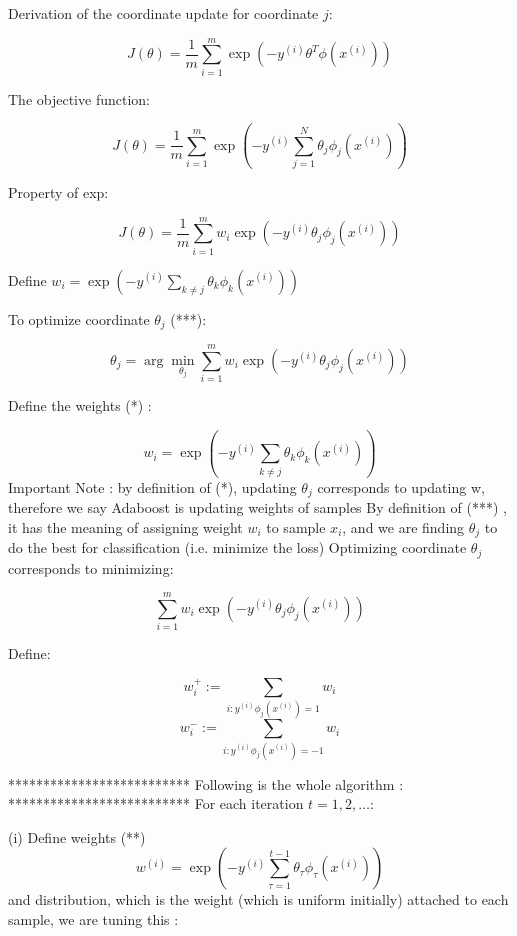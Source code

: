 \documentclass{article}
\begin{document}
Derivation of the coordinate update for coordinate \( j \):

$$J(\theta) = \frac{1}{m} \sum_{i=1}^{m} \exp(-y^{(i)} \theta^T \phi(x^{(i)}))$$

The objective function:

$$J(\theta) = \frac{1}{m} \sum_{i=1}^{m} \exp \left( -y^{(i)} \sum_{j=1}^{N} \theta_j \phi_j(x^{(i)}) \right)$$

Property of exp:

$$J(\theta) = \frac{1}{m} \sum_{i=1}^{m} w_i \exp \left( -y^{(i)} \theta_j \phi_j(x^{(i)}) \right)$$

Define \( w_i = \exp \left( -y^{(i)} \sum_{k \neq j} \theta_k \phi_k(x^{(i)}) \right) \)

To optimize coordinate \( \theta_j \) (***):

$$\theta_j = \arg \min_{\theta_j} \sum_{i=1}^{m} w_i \exp \left( -y^{(i)} \theta_j \phi_j(x^{(i)}) \right)$$

Define the weights (*) :

$$w_i = \exp \left( -y^{(i)} \sum_{k \neq j} \theta_k \phi_k(x^{(i)}) \right)$$ 
Important Note : by definition of (*),  updating \( \theta_j \) corresponds to updating w, therefore we say Adaboost is updating weights of samples \newline
By definition of (***) , it has the meaning of assigning weight \(w_i\) to sample \(x_i\), and we are finding \(\theta_j\) to do the best for classification (i.e. minimize the loss)\newline
Optimizing coordinate \( \theta_j \) corresponds to minimizing:

$$\sum_{i=1}^{m} w_i \exp \left( -y^{(i)} \theta_j \phi_j(x^{(i)}) \right)$$

Define:

$$w_i^+ := \sum_{i: y^{(i)} \phi_j(x^{(i)}) = 1} w_i$$
$$w_i^- := \sum_{i: y^{(i)} \phi_j(x^{(i)}) = -1} w_i$$


**************************\newline
Following is the whole algorithm  : \newline
**************************\newline
For each iteration \( t = 1, 2, \ldots \): \newline

(i) Define weights (**) \[ w^{(i)} = \exp \left( -y^{(i)} \sum_{\tau=1}^{t-1} \theta_{\tau} \phi_{\tau} (x^{(i)}) \right) \] 
and distribution, which is the weight (which is uniform initially) attached to each sample, we are tuning this : 
\end{document}

